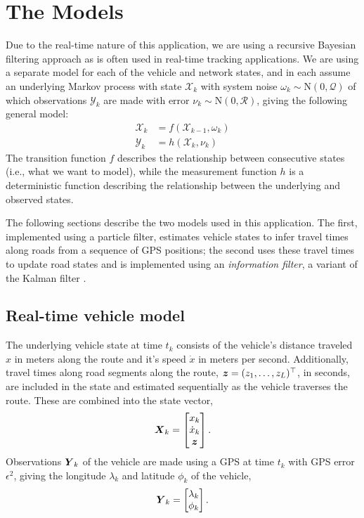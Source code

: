 \section{The Models}
\label{sec:models}

Due to the real-time nature of this application, we are using
a recursive Bayesian filtering approach as is often used in
real-time tracking applications.
We are using a separate model for each of the vehicle and network states,
and in each assume an underlying Markov process with state $\mathcal{X}_k$
with system noise $\omega_k\sim\mathrm{N}(0,\mathcal{Q})$ 
of which observations $\mathcal{Y}_k$ are made
with error $\nu_k\sim\mathrm{N}(0,\mathcal{R})$,
giving the following general model:
\begin{equation}
\label{eq:rbe_model}
\begin{split}
\mathcal{X}_k &= f(\mathcal{X}_{k-1}, \omega_k) \\
\mathcal{Y}_k &= h(\mathcal{X}_k, \nu_k)
\end{split}
\end{equation}
The transition function $f$ describes the relationship between consecutive states
(i.e., what we want to model),
while the measurement function $h$ is a deterministic function describing the
relationship between the underlying and observed states.

The following sections describe the two models used in this application.
The first, implemented using a particle filter, estimates vehicle states
to infer travel times along roads from a sequence of GPS positions;
the second uses these travel times to update road states 
and is implemented using an \emph{information filter},
a variant of the Kalman filter \citep{}.

\subsection{Real-time vehicle model}
\label{sec:pf}

The underlying vehicle state at time $t_k$ consists of
the vehicle's distance traveled $x$ in meters along the route and
it's speed $\dot x$ in meters per second.
Additionally, travel times along road segments along the route, 
$\boldsymbol{z} = (z_1,\ldots,z_L)^\top$, in seconds,
are included in the state and estimated
sequentially as the vehicle traverses the route.
These are combined into the state vector,
\begin{equation}
\label{eq:vehicle_state}
\mbox{$\boldsymbol{X}$}_k = 
\begin{bmatrix}
    x_k \\ \dot x_k \\ \boldsymbol{z}
\end{bmatrix}.
\end{equation}
Observations $\mbox{$\boldsymbol{Y}$}_k$ of the vehicle are made using a GPS at time $t_k$
with GPS error $\epsilon^2$,
giving the longitude $\lambda_k$ and latitude $\phi_k$ of the vehicle,
\begin{equation}
\label{eq:vehicle_obs}
\mbox{$\boldsymbol{Y}$}_k = \begin{bmatrix} \lambda_k \\ \phi_k \end{bmatrix}.
\end{equation}



